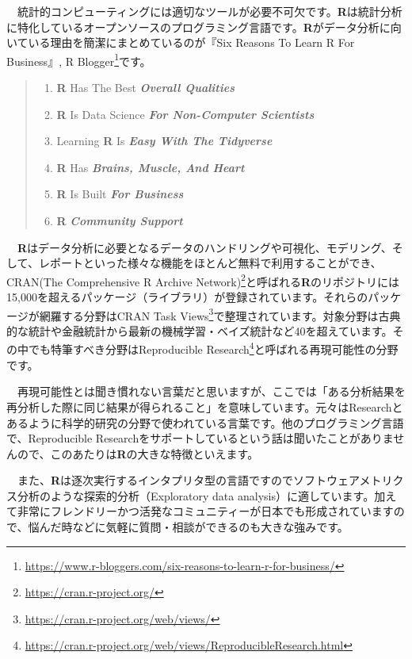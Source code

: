 \documentclass[
  12pt,
]{book}
\DeclareRobustCommand{\href}[2]{#2\footnote{\url{#1}}}
\providecommand{\tightlist}{%
  \setlength{\itemsep}{0pt}\setlength{\parskip}{0pt}}
\begin{document}
　統計的コンピューティングには適切なツールが必要不可欠です。\textbf{R}は統計分析に特化しているオープンソースのプログラミング言語です。\textbf{R}がデータ分析に向いている理由を簡潔にまとめているのが\href{https://www.r-bloggers.com/six-reasons-to-learn-r-for-business/}{『Six Reasons To Learn R For Business』, R Blogger}です。

\begin{quote}
\begin{enumerate}
\def\labelenumi{\arabic{enumi}.}
\tightlist
\item
  \textbf{R} Has The Best \emph{\textbf{Overall Qualities}}
\item
  \textbf{R} Is Data Science \emph{\textbf{For Non-Computer Scientists}}
\item
  Learning \textbf{R} Is \emph{\textbf{Easy With The Tidyverse}}
\item
  \textbf{R} Has \emph{\textbf{Brains, Muscle, And Heart}}
\item
  \textbf{R} Is Built \emph{\textbf{For Business}}
\item
  \textbf{R} \emph{\textbf{Community Support}}
\end{enumerate}
\end{quote}

　\textbf{R}はデータ分析に必要となるデータのハンドリングや可視化、モデリング、そして、レポートといった様々な機能をほとんど無料で利用することができ、\href{https://cran.r-project.org/}{CRAN(The Comprehensive R Archive Network)}と呼ばれる\textbf{R}のリポジトリには15,000を超えるパッケージ（ライブラリ）が登録されています。それらのパッケージが網羅する分野は\href{https://cran.r-project.org/web/views/}{CRAN Task Views}で整理されています。対象分野は古典的な統計や金融統計から最新の機械学習・ベイズ統計など40を超えています。その中でも特筆すべき分野は\href{https://cran.r-project.org/web/views/ReproducibleResearch.html}{Reproducible Research}と呼ばれる再現可能性の分野です。

　再現可能性とは聞き慣れない言葉だと思いますが、ここでは「ある分析結果を再分析した際に同じ結果が得られること」を意味しています。元々はResearchとあるように科学的研究の分野で使われている言葉です。他のプログラミング言語で、Reproducible Researchをサポートしているという話は聞いたことがありませんので、このあたりは\textbf{R}の大きな特徴といえます。

　また、\textbf{R}は逐次実行するインタプリタ型の言語ですのでソフトウェアメトリクス分析のような探索的分析（Exploratory data analysis）に適しています。加えて非常にフレンドリーかつ活発なコミュニティーが日本でも形成されていますので、悩んだ時などに気軽に質問・相談ができるのも大きな強みです。
\end{document}
